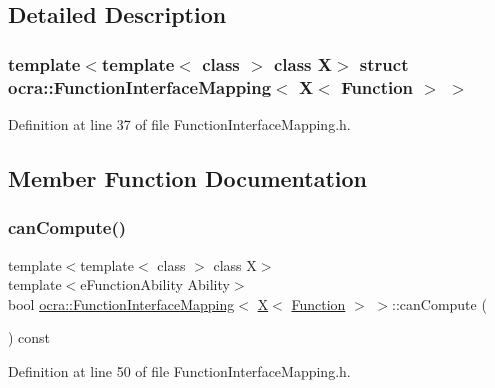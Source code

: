 \subsection{Detailed Description}
\subsubsection*{template$<$template$<$ class $>$ class X$>$\newline
struct ocra\+::\+Function\+Interface\+Mapping$<$ X$<$ Function $>$ $>$}



Definition at line 37 of file Function\+Interface\+Mapping.\+h.



\subsection{Member Function Documentation}
\hypertarget{structocra_1_1FunctionInterfaceMapping_3_01X_3_01Function_01_4_01_4_a0e4d65bb9b0548cf131585fcb1a2a17f}{}\label{structocra_1_1FunctionInterfaceMapping_3_01X_3_01Function_01_4_01_4_a0e4d65bb9b0548cf131585fcb1a2a17f} 
\subsubsection{\texorpdfstring{can\+Compute()}{canCompute()}}
{\footnotesize\ttfamily template$<$template$<$ class $>$ class X$>$ \\
template$<$e\+Function\+Ability Ability$>$ \\
bool \hyperlink{structocra_1_1FunctionInterfaceMapping}{ocra\+::\+Function\+Interface\+Mapping}$<$ \hyperlink{namespaceocra_a436781c7059a0f76027df1c652126260a53f3cfeeb322946db40cd86dfebfb237}{X}$<$ \hyperlink{classocra_1_1Function}{Function} $>$ $>$\+::can\+Compute (\begin{DoxyParamCaption}{ }\end{DoxyParamCaption}) const\hspace{0.3cm}{\ttfamily [inline]}}



Definition at line 50 of file Function\+Interface\+Mapping.\+h.

